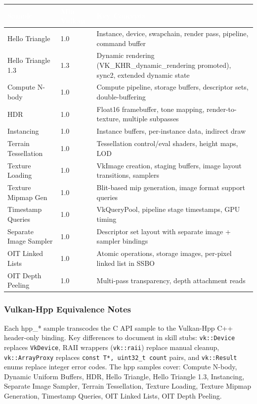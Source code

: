 \documentclass[11pt,letterpaper]{article}
\newcommand{\tableheader}[1]{\textbf{\sffamily\textcolor{white}{#1}}}
\begin{document}
\begin{center}
\begin{tabularx}{\textwidth}{L{4cm}L{2.5cm}X}
\toprule
{}
\tableheader{Sample} & \tableheader{Min Vulkan} & \tableheader{Key Concepts} \\
\midrule
Hello Triangle & 1.0 & Instance, device, swapchain, render pass, pipeline, command buffer \\
Hello Triangle 1.3 & 1.3 & Dynamic rendering (VK\_KHR\_dynamic\_rendering promoted), sync2, extended dynamic state \\
Compute N-body & 1.0 & Compute pipeline, storage buffers, descriptor sets, double-buffering \\
HDR & 1.0 & Float16 framebuffer, tone mapping, render-to-texture, multiple subpasses \\
Instancing & 1.0 & Instance buffers, per-instance data, indirect draw \\
Terrain Tessellation & 1.0 & Tessellation control/eval shaders, height maps, LOD \\
Texture Loading & 1.0 & VkImage creation, staging buffers, image layout transitions, samplers \\
Texture Mipmap Gen & 1.0 & Blit-based mip generation, image format support queries \\
Timestamp Queries & 1.0 & VkQueryPool, pipeline stage timestamps, GPU timing \\
Separate Image Sampler & 1.0 & Descriptor set layout with separate image + sampler bindings \\
OIT Linked Lists & 1.0 & Atomic operations, storage images, per-pixel linked list in SSBO \\
OIT Depth Peeling & 1.0 & Multi-pass transparency, depth attachment reads \\
\bottomrule
\end{tabularx}
\end{center}

\subsubsection{Vulkan-Hpp Equivalence Notes}

Each hpp\_* sample transcodes the C API sample to the Vulkan-Hpp C++ header-only binding. Key differences to document in skill stubs: \texttt{vk::Device} replaces \texttt{VkDevice}, RAII wrappers (\texttt{vk::raii}) replace manual cleanup, \texttt{vk::ArrayProxy} replaces \texttt{const T*, uint32\_t count} pairs, and \texttt{vk::Result} enums replace integer error codes. The hpp samples cover: Compute N-body, Dynamic Uniform Buffers, HDR, Hello Triangle, Hello Triangle 1.3, Instancing, Separate Image Sampler, Terrain Tessellation, Texture Loading, Texture Mipmap Generation, Timestamp Queries, OIT Linked Lists, OIT Depth Peeling.
\end{document}
